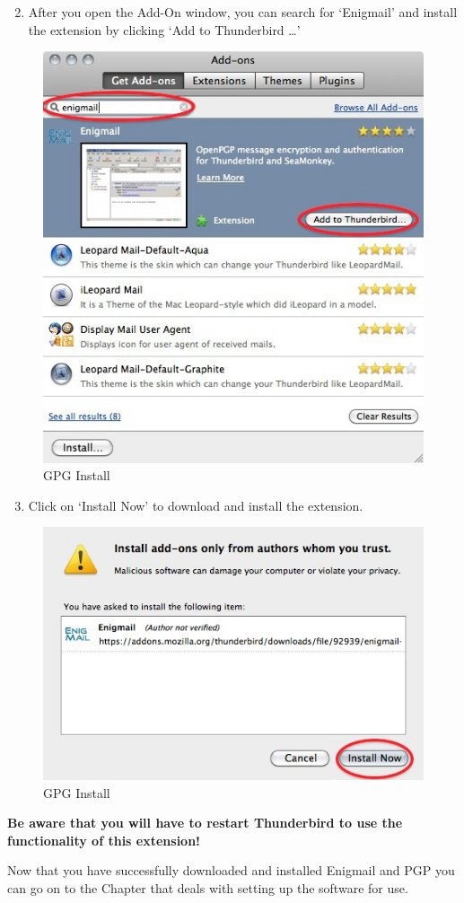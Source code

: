 \begin{enumerate}[1.]
\setcounter{enumi}{1}
\item
  After you open the Add-On window, you can search for `Enigmail' and
  install the extension by clicking `Add to Thunderbird \ldots{}'
\end{enumerate}
\begin{figure}[htbp]
\centering
\includegraphics{enigmail_mac_inst_1.jpg}
\caption{GPG Install}
\end{figure}

\begin{enumerate}[1.]
\setcounter{enumi}{2}
\item
  Click on `Install Now' to download and install the extension.
\end{enumerate}
\begin{figure}[htbp]
\centering
\includegraphics{enigmail_mac_inst_2.jpg}
\caption{GPG Install}
\end{figure}

\textbf{Be aware that you will have to restart Thunderbird to use the
functionality of this extension!}

Now that you have successfully downloaded and installed Enigmail and PGP
you can go on to the Chapter that deals with setting up the software for
use.
